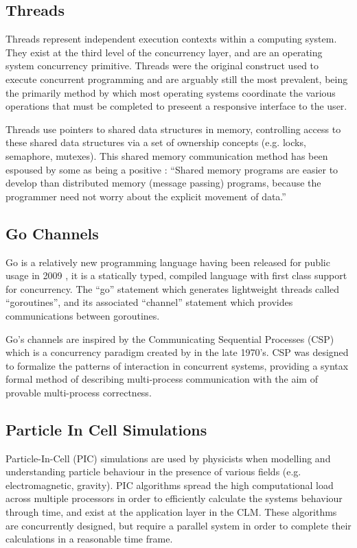 \documentclass{sig-alternate}
\begin{document}
\subsection{Threads}
Threads represent independent execution contexts within a computing system. They exist at the third level of the concurrency layer, and are an operating system concurrency primitive. Threads were the original construct used to execute concurrent programming and are arguably still the most prevalent, being the primarily method by which most operating systems coordinate the various operations that must be completed to preseent a responsive interface to the user.

Threads use pointers to shared data structures in memory, controlling access to these shared data structures via a set of ownership concepts (e.g. locks, semaphore, mutexes). This shared memory communication method has been espoused by some as being a positive \cite{john90:_munin}: ``Shared memory programs are easier to develop than distributed memory (message passing) programs, because the programmer need not worry about the explicit movement of data.'' 

\subsection{Go Channels}
Go is a relatively new programming language having been released for public usage in 2009 \cite{go:_frequen_asked_quest}, it is a statically typed, compiled language with first class support for concurrency. The ``go'' statement which generates lightweight threads called ``goroutines'', and its associated ``channel'' statement which provides communications between goroutines.

Go's channels are inspired by the Communicating Sequential Processes (CSP) which is a concurrency paradigm created by \cite{Hoare:1978:CSP:359576.359585} in the late 1970's. CSP was designed to formalize the patterns of interaction in concurrent systems, providing a syntax formal method of describing multi-process communication with the aim of provable multi-process correctness.

\subsection{Particle In Cell Simulations}
Particle-In-Cell (PIC) simulations are used by physicists when modelling and understanding particle behaviour in the presence of various fields (e.g. electromagnetic, gravity). PIC algorithms spread the high computational load across multiple processors in order to efficiently calculate the systems behaviour through time, and exist at the application layer in the CLM. These algorithms are concurrently designed, but require a parallel system in order to complete their calculations in a reasonable time frame. 
\end{document}
